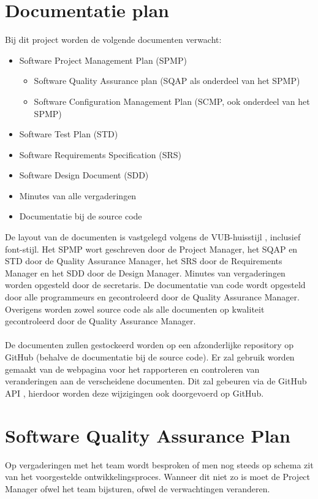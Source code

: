\section{Documentatie plan} \label{sec:DocumentationPlan} %
Bij dit project worden de volgende documenten verwacht:
\begin{itemize}
	\item Software Project Management Plan (SPMP)
	    \begin{itemize}
	        \item Software Quality Assurance plan (SQAP als onderdeel van het SPMP)
	        \item Software Configuration Management Plan (SCMP, ook onderdeel van het SPMP)
	    \end{itemize}
	\item Software Test Plan (STD)
	\item Software Requirements Specification (SRS)
	\item Software Design Document (SDD)
	\item Minutes van alle vergaderingen
	\item Documentatie bij de source code
\end{itemize}
De layout van de documenten is vastgelegd volgens de VUB-huisstijl \cite{VUBHuisstijl}, inclusief font-stijl. Het SPMP wort geschreven door de Project Manager, het SQAP en STD door de Quality Assurance Manager, het SRS door de Requirements Manager en het SDD door de Design Manager. Minutes van vergaderingen worden opgesteld door de secretaris. De documentatie van code wordt opgesteld door alle programmeurs en gecontroleerd door de Quality Assurance Manager. Overigens worden zowel source code als alle documenten op kwaliteit gecontroleerd door de Quality Assurance Manager. 
\\
\\
De documenten zullen gestockeerd worden op een afzonderlijke repository op GitHub (behalve de documentatie bij de source code). Er zal gebruik worden gemaakt van de webpagina \cite{portalWebsite} voor het rapporteren en controleren van veranderingen aan de verscheidene documenten. Dit zal gebeuren via de GitHub API \cite{GitHubAPI}, hierdoor worden deze wijzigingen ook doorgevoerd op GitHub.

\section{Software Quality Assurance Plan}
Op vergaderingen met het team wordt besproken of men nog steeds op schema zit van het voorgestelde ontwikkelingsproces. Wanneer dit niet zo is moet de Project Manager ofwel het team bijsturen, ofwel de verwachtingen veranderen.

